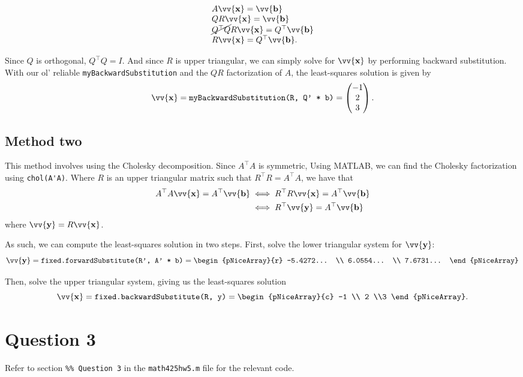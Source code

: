 \documentclass[12pt]{article}
\newcommand{\vect}[1]{\vv{\mathbf{#1}}}
\newcommand{\code}[1]{\texttt{#1}}
\begin{document}
$$
\begin{array}{ll}
A\vect{x} = \vect{b} \\
QR\vect{x} = \vect{b} \\
\cancel{Q^\top Q}R\vect{x} = Q^\top\vect{b}  \\
R\vect{x} = Q^\top\vect{b}.
\end{array}
$$

Since $Q$ is orthogonal, $Q^\top Q=I$. And since $R$ is upper triangular, we can simply solve for $\vect{x}$ by performing backward substitution. With our ol' reliable \code{myBackwardSubstitution} and the $QR$ factorization of $A$, the least-squares solution is given by
$$
\vect{x} = \code{myBackwardSubstitution(R, Q' * b)} = \begin{pmatrix}
    -1 \\ 2 \\ 3
\end{pmatrix}.
$$

\subsection*{Method two}

This method involves using the Cholesky decomposition. Since $A^\top A$ is symmetric, Using MATLAB, we can find the Cholesky factorization using \verb|chol(A'A)|. Where $R$ is  an upper triangular matrix such that $R^\top R = A^\top A$, we have that
\begin{align*}
    A^\top A\vect{x} = A^\top\vect{b} &\iff R^\top R\vect{x} = A^\top\vect{b} \\
    &\iff R^\top\vect{y} = A^\top\vect{b}
\end{align*}
where $\vect{y} = R\vect{x}$.

As such, we can compute the least-squares solution in two steps. First, solve the lower triangular system for $\vect{y}$:
$$
\vect{y} = \code{fixed.forwardSubstitute(R', A' * b)} = \begin{pNiceArray}{r}
    -5.4272... \\
    6.0554... \\
    7.6731...
\end{pNiceArray}
$$

Then, solve the upper triangular system, giving us the least-squares solution
$$
\vect{x} = \code{fixed.backwardSubstitute(R, y)} = \begin{pNiceArray}{c}
    -1 \\ 2 \\3
\end{pNiceArray}.
$$

\section*{Question 3}

Refer to section \code{\%\% Question 3} in the \code{math425hw5.m} file for the relevant code.
\end{document}
